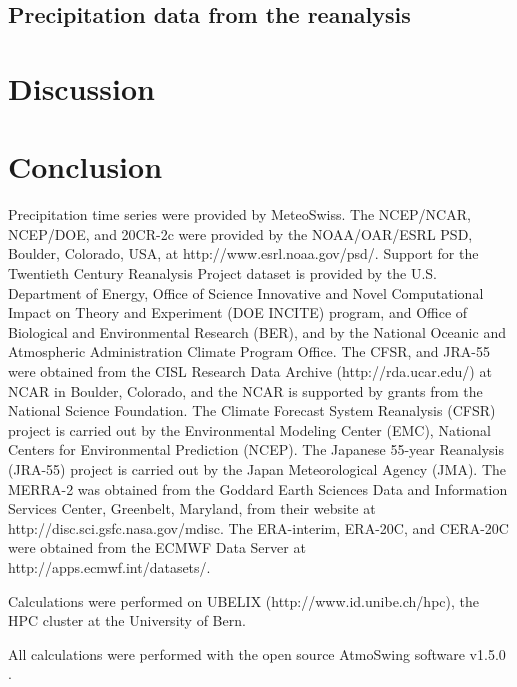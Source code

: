 \documentclass{ametsoc}
\begin{document}
\subsection{Precipitation data from the reanalysis}


\section{Discussion}


\section{Conclusion}


%
\acknowledgments
Precipitation time series were provided by MeteoSwiss. The NCEP/NCAR, NCEP/DOE, and 20CR-2c were provided by the NOAA/OAR/ESRL PSD, Boulder, Colorado, USA, at http://www.esrl.noaa.gov/psd/. Support for the Twentieth Century Reanalysis Project dataset is provided by the U.S. Department of Energy, Office of Science Innovative and Novel Computational Impact on Theory and Experiment (DOE INCITE) program, and Office of Biological and Environmental Research (BER), and by the National Oceanic and Atmospheric Administration Climate Program Office. The CFSR, and JRA-55 were obtained from the CISL Research Data Archive (http://rda.ucar.edu/) at NCAR in Boulder, Colorado, and the NCAR is supported by grants from the National Science Foundation. The Climate Forecast System Reanalysis (CFSR) project is carried out by the Environmental Modeling Center (EMC), National Centers for Environmental Prediction (NCEP). The Japanese 55-year Reanalysis (JRA-55) project is carried out by the Japan Meteorological Agency (JMA). The MERRA-2 was obtained from the Goddard Earth Sciences Data and Information Services Center, Greenbelt, Maryland, from their website at http://disc.sci.gsfc.nasa.gov/mdisc. The ERA-interim, ERA-20C, and CERA-20C were obtained from the ECMWF Data Server at http://apps.ecmwf.int/datasets/. 

Calculations were performed on UBELIX (http://www.id.unibe.ch/hpc), the HPC cluster at the University of Bern.

All calculations were performed with the open source AtmoSwing software v1.5.0 \citep{Horton2017a}.


%
\end{document}

